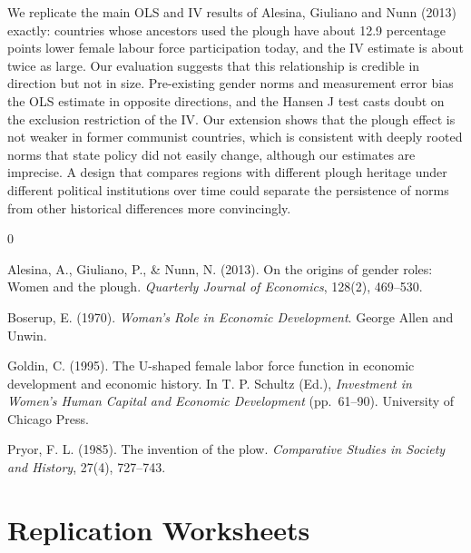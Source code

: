 \documentclass[12pt,a4paper]{article}
\begin{document}
We replicate the main OLS and IV results of Alesina, Giuliano and Nunn (2013) exactly: countries whose ancestors used the plough have about 12.9 percentage points lower female labour force participation today, and the IV estimate is about twice as large. Our evaluation suggests that this relationship is credible in direction but not in size. Pre-existing gender norms and measurement error bias the OLS estimate in opposite directions, and the Hansen J test casts doubt on the exclusion restriction of the IV. Our extension shows that the plough effect is not weaker in former communist countries, which is consistent with deeply rooted norms that state policy did not easily change, although our estimates are imprecise. A design that compares regions with different plough heritage under different political institutions over time could separate the persistence of norms from other historical differences more convincingly.

\begin{thebibliography}{0}
\makeatletter\renewcommand\@biblabel[1]{}\makeatother
\setlength{\leftskip}{1.5em}\setlength{\itemindent}{-1.5em}

 Alesina, A., Giuliano, P., \& Nunn, N. (2013). On the origins of gender roles: Women and the plough. \textit{Quarterly Journal of Economics}, 128(2), 469--530.

 Boserup, E. (1970). \textit{Woman's Role in Economic Development}. George Allen and Unwin.

 Goldin, C. (1995). The U-shaped female labor force function in economic development and economic history. In T. P. Schultz (Ed.), \textit{Investment in Women's Human Capital and Economic Development} (pp.~61--90). University of Chicago Press.

 Pryor, F. L. (1985). The invention of the plow. \textit{Comparative Studies in Society and History}, 27(4), 727--743.
\end{thebibliography}

\clearpage
\appendix
\section{Replication Worksheets}
\end{document}
